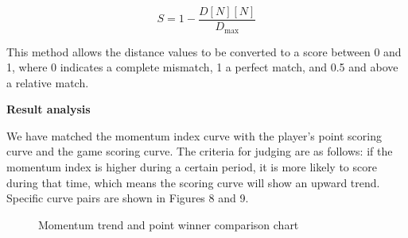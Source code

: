 \documentclass[12pt]{article}  %
\begin{document}
\begin{equation}
	S = 1 - \frac{D[N][N]}{D_{\text{max}}}
\end{equation}

This method allows the distance values to be converted to a score between 0 and 1, where 0 indicates a complete mismatch, 1 a perfect match, and 0.5 and above a relative match.

\noindent\textbf{Result analysis}

We have matched the momentum index curve with the player's point scoring curve and the game scoring curve. The criteria for judging are as follows: if the momentum index is higher during a certain period, it is more likely to score during that time, which means the scoring curve will show an upward trend. Specific curve pairs are shown in Figures 8 and 9.

\begin{figure}[htbp]
    \centering    
    \caption{Momentum trend and point winner comparison chart}		%
    \label{Fig:Flexibility}									%
\end{figure}
\FloatBarrier
\end{document}
